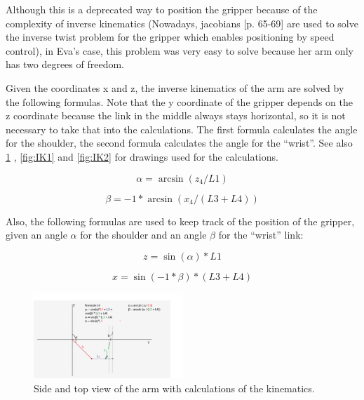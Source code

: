 \documentclass[project_eva.tex]{subfiles}
\begin{document}
Although this is a deprecated way to position the gripper because of the complexity of inverse kinematics  (Nowadays, 
jacobians \cite{jacobian} [p. 65-69] are used to solve the inverse twist 
problem for the gripper which enables positioning by speed control), in Eva's case, this problem was very easy to solve 
because her arm only has two degrees of freedom. 

Given the coordinates x and z, the inverse kinematics of the arm are solved by the following formulas. Note that the y 
coordinate of the gripper depends on the z coordinate because the link in the middle always stays horizontal, so it is not 
necessary to take that into the calculations. The first formula calculates the angle for the shoulder, the second formula 
calculates the angle for the ``wrist''. See also \ref{fig:IK0} , \ref{fig:IK1} and \ref{fig:IK2} for drawings used for the calculations.

\begin{equation*}
\alpha = \arcsin(z_4/L1)
\end{equation*}

\begin{equation*}
\beta = -1 * \arcsin(x_4/(L3 + L4))
\end{equation*}

Also, the following formulas are used to keep track of the position of the gripper, given an angle $\alpha$ for the 
shoulder and an angle $\beta$ for the ``wrist'' link:

\begin{equation*}
z = \sin(\alpha)*L1
\end{equation*}

\begin{equation*}
x = \sin(-1 * \beta)*(L3 + L4)
\end{equation*}

\begin{figure}[h]
	\centering
	\mbox{\includegraphics[width=0.5\textwidth]{Images/3d_zijenbovenaanzicht.png}}
	\caption{Side and top view of the arm with calculations of the kinematics.}
	\label{fig:IK0}
\end{figure}
\end{document}
